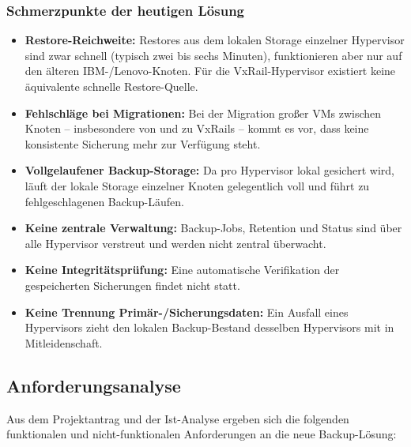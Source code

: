 \subsubsection*{Schmerzpunkte der heutigen Lösung}
\begin{itemize}
    \item \textbf{Restore-Reichweite:} Restores aus dem lokalen
          Storage einzelner Hypervisor sind zwar schnell (typisch
          zwei bis sechs Minuten), funktionieren aber nur auf den
          älteren IBM-/Lenovo-Knoten. Für die VxRail-Hypervisor
          existiert keine äquivalente schnelle Restore-Quelle.
    \item \textbf{Fehlschläge bei Migrationen:} Bei der Migration
          großer \acp{VM} zwischen Knoten -- insbesondere von und zu
          VxRails -- kommt es vor, dass keine konsistente Sicherung
          mehr zur Verfügung steht.
    \item \textbf{Vollgelaufener Backup-Storage:} Da pro Hypervisor
          lokal gesichert wird, läuft der lokale Storage einzelner
          Knoten gelegentlich voll und führt zu fehlgeschlagenen
          Backup-Läufen.
    \item \textbf{Keine zentrale Verwaltung:} Backup-Jobs, Retention
          und Status sind über alle Hypervisor verstreut und werden
          nicht zentral überwacht.
    \item \textbf{Keine Integritätsprüfung:} Eine automatische
          Verifikation der gespeicherten Sicherungen findet nicht
          statt.
    \item \textbf{Keine Trennung Primär-/Sicherungsdaten:} Ein
          Ausfall eines Hypervisors zieht den lokalen Backup-Bestand
          desselben Hypervisors mit in Mitleidenschaft.
\end{itemize}


\subsection{Anforderungsanalyse}
\label{sec:Anforderungsanalyse}
Aus dem Projektantrag und der Ist-Analyse ergeben sich die folgenden
funktionalen und nicht-funktionalen Anforderungen an die neue
Backup-Lösung:

